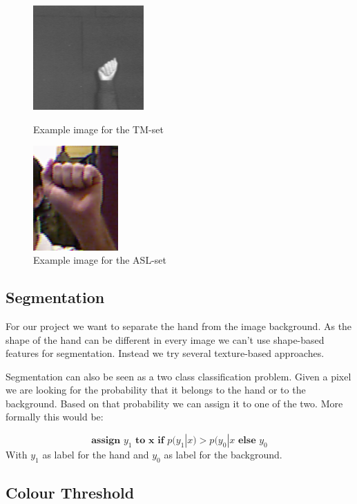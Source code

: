 \documentclass[letterpaper, 10 pt, conference]{ieeeconf}  %
\begin{document}
\begin{figure}
\centering
\begin{minipage}{0.4\linewidth}
\includegraphics[height=4cm]{a-tm}
\caption{Example image for the TM-set}
\label{fig:tm-set}
\end{minipage}
\hfill
\begin{minipage}{0.4\linewidth}
\includegraphics[height=4cm]{a-asl}
\caption{Example image for the ASL-set}
\label{fig:asl-set}
\end{minipage}
\end{figure}
\subsection{Segmentation}

For our project we want to separate the hand from the image background. As the shape of the hand can be different in every image we can't use shape-based features for segmentation. Instead we try several texture-based approaches. 

Segmentation can also be seen as a two class classification problem. Given a pixel we are looking for the probability that it belongs to the hand or to the background. Based on that probability we can assign it to one of the two. More formally this would be:

\begin{equation}
	\textbf{assign } y_1 \textbf{ to x if } p(y_1|x) > p(y_0|x \textbf{ else } y_0
\end{equation}
With $y_1$ as label for the hand and $y_0$ as label for the background. 

\subsection{Colour Threshold}
\end{document}
